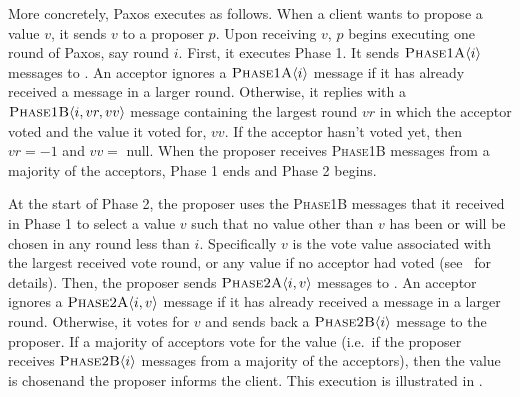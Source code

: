 More concretely, Paxos executes as follows. When a client wants to propose a
value $v$, it sends $v$ to a proposer $p$. Upon receiving $v$, $p$ begins
executing one round of Paxos, say round $i$. First, it executes Phase 1. It
%
sends $\textsc{Phase1A}\langle{i}\rangle$ messages to . An acceptor
ignores a $\textsc{Phase1A}\langle{i}\rangle$ message if it has already received a message in a
larger round.  Otherwise, it replies with a $\textsc{Phase1B}\langle{i, vr, vv}\rangle$ message
containing the largest round $vr$ in which the acceptor voted and the value it
voted for, $vv$. If the acceptor hasn't voted yet, then $vr = -1$ and $vv = $
\textsf{null}. When the proposer receives \textsc{Phase1B} messages from a
majority of the acceptors, Phase 1 ends and Phase 2 begins.

At the start of Phase 2, the proposer uses the \textsc{Phase1B} messages that
it received in Phase 1 to select a value $v$ such that no value other than $v$
has been or will be chosen in any round less than $i$. Specifically $v$ is the
vote value associated with the largest received vote round, or any value if no
acceptor had voted (see~\cite{lamport2001paxos} for details). Then, the
%
proposer sends $\textsc{Phase2A}\langle{i, v}\rangle$ messages to . An
acceptor ignores a $\textsc{Phase2A}\langle{i, v}\rangle$ message if it has already received a
message in a larger round. Otherwise, it votes for $v$ and sends back a
$\textsc{Phase2B}\langle{i}\rangle$ message to the proposer. If a majority of acceptors vote for the
value (i.e.\ if the proposer receives $\textsc{Phase2B}\langle{i}\rangle$ messages from a
%
majority of the acceptors), then the value is chosenand the proposer informs the
client. This execution is illustrated in .
%

